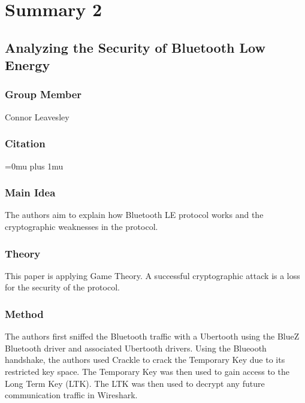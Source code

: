 \section{Summary 2}

\noindenlt
\subsection{{A}nalyzing the {S}ecurity of {B}luetooth {L}ow {E}nergy}

\subsubsection{Group Member}

\noindent
Connor Leavesley

\noindent
\subsubsection{Citation}

\Urlmuskip=0mu plus 1mu\relax

\subsubsection{Main Idea}

\noindent
The authors aim to explain how Bluetooth LE protocol works and the cryptographic weaknesses in the protocol.

\subsubsection{Theory}

\noindent
This paper is applying Game Theory. A successful cryptographic attack is a loss for the security of the protocol. 

\subsubsection{Method}

\noindent
The authors first sniffed the Bluetooth traffic with a Ubertooth using the BlueZ Bluetooth driver and associated Ubertooth drivers. Using the Blueooth handshake, the authors used Crackle to crack the Temporary Key due to its restricted key space. The Temporary Key was then used to gain access to the Long Term Key (LTK). The LTK was then used to decrypt any future communication traffic in Wireshark. 

